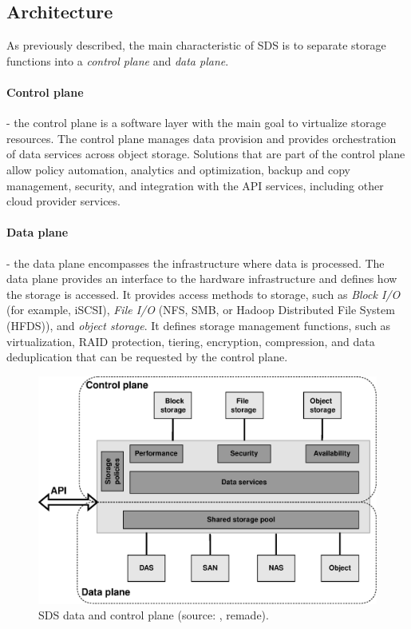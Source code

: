     \subsection*{Architecture}
    As previously described, the main characteristic of SDS is to separate storage functions into a \textit{control plane} and \textit{data plane}.

    \paragraph{Control plane}
    - the control plane is a software layer with the main goal to virtualize storage resources. The control plane manages data provision and provides orchestration of data services across object storage. Solutions that are part of the control plane allow policy automation, analytics and optimization, backup and copy management, security, and integration with the API services, including other cloud provider services\cite{sdsIBMSDSGuide}.

    \paragraph{Data plane}
    - the data plane encompasses the infrastructure where data is processed. The data plane provides an interface to the hardware infrastructure and defines how the storage is accessed. It provides access methods to storage, such as \textit{Block I/O} (for example, iSCSI), \textit{File I/O} (NFS, SMB, or Hadoop Distributed File System (HFDS)), and \textit{object storage}. It defines storage management functions, such as virtualization, RAID protection, tiering, encryption, compression, and data deduplication that can be requested by the control plane\cite{sdsIBMSDSGuide}.

    \begin{figure}[H]
        \centering
        \includegraphics[width=1\textwidth]{obrazky-figures/sds-planes.eps}
        \caption{SDS data and control plane (source: \cite{sdsPlanes}, remade).}
        \label{fig:sdsPlanes}
    \end{figure}

